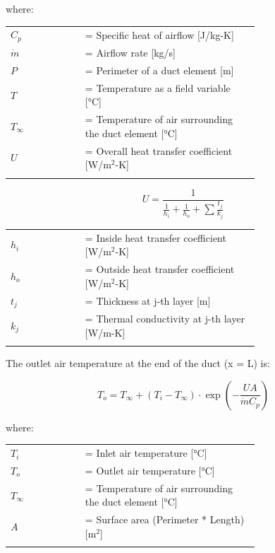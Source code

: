where:

\begin{tabular}{lp{0.7\linewidth}}
\\
$C_p$ &= Specific heat of airflow [J/kg-K]\\
$\dot{m}$ &= Airflow rate [kg/s]\\
$P$ &= Perimeter of a duct element [m]\\
$T$ &= Temperature as a field variable [°C]\\
$T_\infty$ &= Temperature of air surrounding the duct element [°C]\\
$U$ &= Overall heat transfer coefficient [W/m\(^{2}\)-K]\\
\\
\end{tabular}

\begin{equation}
U = \frac{1}{{\frac{1}{{{h_i}}} + \frac{1}{{{h_o}}} + \sum {\frac{{{t_j}}}{{{k_j}}}} }}
\end{equation}

\begin{tabular}{lp{0.7\linewidth}}
\\
$h_i$ &= Inside heat transfer coefficient [W/m\(^{2}\)-K]\\
$h_o$ &= Outside heat transfer coefficient [W/m\(^{2}\)-K]\\
$t_j$ &= Thickness at j-th layer [m]\\
$k_j$ &= Thermal conductivity at j-th layer [W/m-K]\\
\\
\end{tabular}

The outlet air temperature at the end of the duct (x = L) is:

\begin{equation}
T_o = T_\infty + (T_i - T_\infty) \cdot \exp \left(- \frac{UA}{\dot{m} C_p} \right)
\end{equation}

where:

\begin{tabular}{lp{0.7\linewidth}}
\\
$T_i$ &= Inlet air temperature [°C]\\
$T_o$ &= Outlet air temperature [°C]\\
$T_\infty$ &= Temperature of air surrounding the duct element [°C]\\
$A$ &= Surface area (Perimeter * Length) [m\(^{2}\)]\\
\\
\end{tabular}

